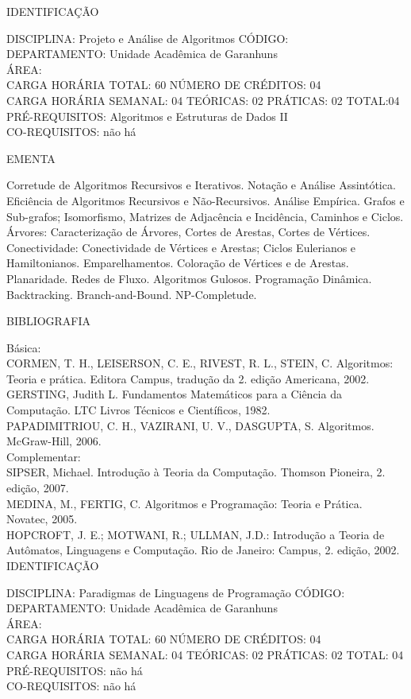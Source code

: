 \documentclass[
	12pt,				%
	openright,			%
  oneside,     %
	a4paper,			%
	english,			%
	french,				%
	spanish,			%
	brazil				%
	]{abntex2}
\begin{document}
\begin{apendicesenv}
\newpage IDENTIFICAÇÃO

DISCIPLINA: Projeto e Análise de Algoritmos CÓDIGO:\\
DEPARTAMENTO: Unidade Acadêmica de Garanhuns\\
ÁREA: \\
CARGA HORÁRIA TOTAL: 60 NÚMERO DE CRÉDITOS: 04\\
CARGA HORÁRIA SEMANAL: 04 TEÓRICAS: 02 PRÁTICAS: 02 TOTAL:04\\
PRÉ-REQUISITOS: Algoritmos e Estruturas de Dados II\\
CO-REQUISITOS: não há

EMENTA 

Corretude de Algoritmos Recursivos e Iterativos. Notação e Análise
Assintótica. Eficiência de Algoritmos Recursivos e Não-Recursivos.
Análise Empírica. Grafos e Sub-grafos; Isomorfismo, Matrizes de
Adjacência e Incidência, Caminhos e Ciclos. Árvores: Caracterização de
Árvores, Cortes de Arestas, Cortes de Vértices. Conectividade:
Conectividade de Vértices e Arestas; Ciclos Eulerianos e Hamiltonianos.
Emparelhamentos. Coloração de Vértices e de Arestas. Planaridade. Redes
de Fluxo. Algoritmos Gulosos. Programação Dinâmica. Backtracking.
Branch-and-Bound. NP-Completude.

BIBLIOGRAFIA 

Básica:\\
CORMEN, T. H., LEISERSON, C. E., RIVEST, R. L., STEIN, C. Algoritmos:
Teoria e prática. Editora Campus, tradução da 2. edição Americana,
2002.\\
GERSTING, Judith L. Fundamentos Matemáticos para a Ciência da
Computação. LTC  Livros Técnicos e Científicos, 1982.\\
PAPADIMITRIOU, C. H., VAZIRANI, U. V., DASGUPTA, S. Algoritmos.
McGraw-Hill, 2006.\\
Complementar:\\
SIPSER, Michael. Introdução à Teoria da Computação. Thomson Pioneira, 2.
edição, 2007.\\
MEDINA, M., FERTIG, C. Algoritmos e Programação: Teoria e Prática.
Novatec, 2005.\\
HOPCROFT, J. E.; MOTWANI, R.; ULLMAN, J.D.: Introdução a Teoria de
Autômatos, Linguagens e Computação. Rio de Janeiro: Campus, 2. edição, 2002.\\


\newpage IDENTIFICAÇÃO

DISCIPLINA: Paradigmas de Linguagens de Programação CÓDIGO:\\ 
DEPARTAMENTO: Unidade Acadêmica de Garanhuns\\
ÁREA: \\
CARGA HORÁRIA TOTAL: 60 NÚMERO DE CRÉDITOS: 04\\
CARGA HORÁRIA SEMANAL: 04 TEÓRICAS: 02 PRÁTICAS: 02 TOTAL: 04\\
PRÉ-REQUISITOS: não há\\
CO-REQUISITOS: não há


\end{apendicesenv}
\end{document}
